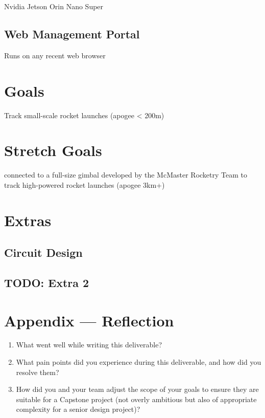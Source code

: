 \documentclass{article}
\begin{document}
Nvidia Jetson Orin Nano Super

\subsection{Web Management Portal}

Runs on any recent web browser

\section{Goals}

Track small-scale rocket launches (apogee < 200m)

\section{Stretch Goals}

connected to a full-size gimbal developed by the McMaster Rocketry Team to track high-powered rocket launches (apogee 3km+)

\section{Extras}


\subsection{Circuit Design}

\subsection{TODO: Extra 2}


\newpage{}

\section*{Appendix --- Reflection}




\begin{enumerate}
    \item What went well while writing this deliverable? 
    \item What pain points did you experience during this deliverable, and how
    did you resolve them?
    \item How did you and your team adjust the scope of your goals to ensure
    they are suitable for a Capstone project (not overly ambitious but also of
    appropriate complexity for a senior design project)?
\end{enumerate}  
\end{document}
